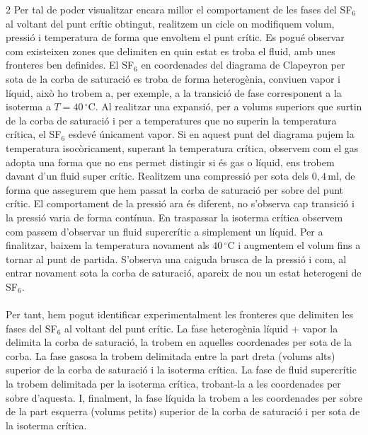 \documentclass[12pt,twosides,onecolumn,openany]{article}
\begin{document}
\begin{multicols}{2}
Per tal de poder visualitzar encara millor el comportament de les fases del SF$_6$ al voltant del punt crític obtingut, realitzem un cicle on modifiquem volum, pressió i temperatura de forma que envoltem el punt crític. Es pogué observar com existeixen zones que delimiten en quin estat es troba el fluid, amb unes fronteres ben definides. El SF$_6$ en coordenades del diagrama de Clapeyron per sota de la corba de saturació es troba de forma heterogènia, conviuen vapor i líquid, això ho trobem a, per exemple, a la transició de fase corresponent a la isoterma a \(T=40\,^\circ\text{C}\). Al realitzar una expansió, per a volums superiors que surtin de la corba de saturació i per a temperatures que no superin la temperatura crítica, el SF$_6$ esdevé únicament vapor. Si en aquest punt del diagrama pujem la temperatura isocòricament, superant la temperatura crítica, observem com el gas adopta una forma que no ens permet distingir si és gas o líquid, ens trobem davant d'un fluid super crític. Realitzem una compressió per sota dels \(0,4 \, \text{ml}\), de forma que assegurem que hem passat la corba de saturació per sobre del punt crític. El comportament de la pressió ara és diferent, no s'observa cap transició i la pressió varia de forma contínua. En traspassar la isoterma crítica observem com passem d'observar un fluid supercrític a simplement un líquid. Per a finalitzar, baixem la temperatura novament als \(40 \, ^\circ\text{C}\) i augmentem el volum fins a tornar al punt de partida. S'observa una caiguda brusca de la pressió i com, al entrar novament sota la corba de saturació, apareix de nou un estat heterogeni de SF$_6$.\\\\
Per tant, hem pogut identificar experimentalment les fronteres que delimiten les fases del SF$_6$ al voltant del punt crític. La fase heterogènia líquid + vapor la delimita la corba de saturació, la trobem en aquelles coordenades per sota de la corba. La fase gasosa la trobem delimitada entre la part dreta (volums alts) superior de la corba de saturació i la isoterma crítica. La fase de fluid supercrític la trobem delimitada per la isoterma crítica, trobant-la a les coordenades per sobre d'aquesta. I, finalment, la fase líquida la trobem a les coordenades per sobre de la part esquerra (volums petits) superior de la corba de saturació i per sota de la isoterma crítica.

\end{multicols}
\end{document}
